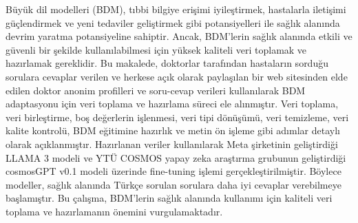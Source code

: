 \sloppy
  Büyük dil modelleri (BDM), tıbbi bilgiye erişimi iyileştirmek, hastalarla iletişimi güçlendirmek ve yeni tedaviler geliştirmek gibi potansiyelleri ile sağlık alanında devrim yaratma potansiyeline sahiptir. Ancak, BDM'lerin sağlık alanında etkili ve güvenli bir şekilde kullanılabilmesi için yüksek kaliteli veri toplamak ve hazırlamak gereklidir. Bu makalede, doktorlar tarafından hastaların sorduğu sorulara cevaplar verilen ve herkese açık olarak paylaşılan bir web sitesinden elde edilen doktor anonim profilleri ve soru-cevap verileri kullanılarak BDM adaptasyonu için veri toplama ve hazırlama süreci ele alınmıştır. Veri toplama, veri birleştirme, boş değerlerin işlenmesi, veri tipi dönüşümü, veri temizleme, veri kalite kontrolü, BDM eğitimine hazırlık ve metin ön işleme gibi adımlar detaylı olarak açıklanmıştır. Hazırlanan veriler kullanılarak Meta şirketinin geliştirdiği LLAMA 3 modeli ve YTÜ COSMOS yapay zeka araştırma grubunun geliştirdiği cosmosGPT v0.1 modeli üzerinde fine-tuning işlemi gerçekleştirilmiştir. Böylece modeller, sağlık alanında Türkçe sorulan sorulara daha iyi cevaplar verebilmeye başlamıştır. Bu çalışma, BDM'lerin sağlık alanında kullanımı için kaliteli veri toplama ve hazırlamanın önemini vurgulamaktadır.

